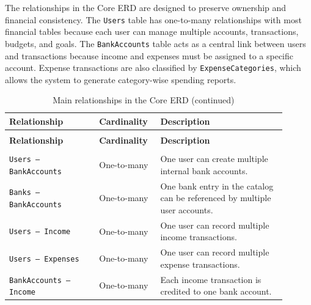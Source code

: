 \documentclass{article}
\begin{document}
The relationships in the Core ERD are designed to preserve ownership and financial consistency.
The \texttt{Users} table has one-to-many relationships with most financial tables because each
user can manage multiple accounts, transactions, budgets, and goals. The \texttt{BankAccounts}
table acts as a central link between users and transactions because income and expenses must be
assigned to a specific account. Expense transactions are also classified by \texttt{ExpenseCategories},
which allows the system to generate category-wise spending reports.

\small
\renewcommand{\arraystretch}{1.2}

\begin{longtable}{
    >{\raggedright\arraybackslash}p{0.30\linewidth}
    >{\centering\arraybackslash}p{0.18\linewidth}
    J{0.42\linewidth}
}
\caption{Main relationships in the Core ERD}
\label{tab:core-relationships} \\

\toprule
\textbf{Relationship} & \textbf{Cardinality} & \textbf{Description} \\
\midrule
\endfirsthead

\caption[]{Main relationships in the Core ERD (continued)} \\

\toprule
\textbf{Relationship} & \textbf{Cardinality} & \textbf{Description} \\
\midrule
\endhead

\midrule
{} \\
\endfoot

\bottomrule
\endlastfoot

\texttt{Users -- BankAccounts}
    & One-to-many
    & One user can create multiple internal bank accounts. \\

\texttt{Banks -- BankAccounts}
    & One-to-many
    & One bank entry in the catalog can be referenced by multiple user accounts. \\

\texttt{Users -- Income}
    & One-to-many
    & One user can record multiple income transactions. \\

\texttt{Users -- Expenses}
    & One-to-many
    & One user can record multiple expense transactions. \\

\texttt{BankAccounts -- Income}
    & One-to-many
    & Each income transaction is credited to one bank account. \\


\end{longtable}
\end{document}
